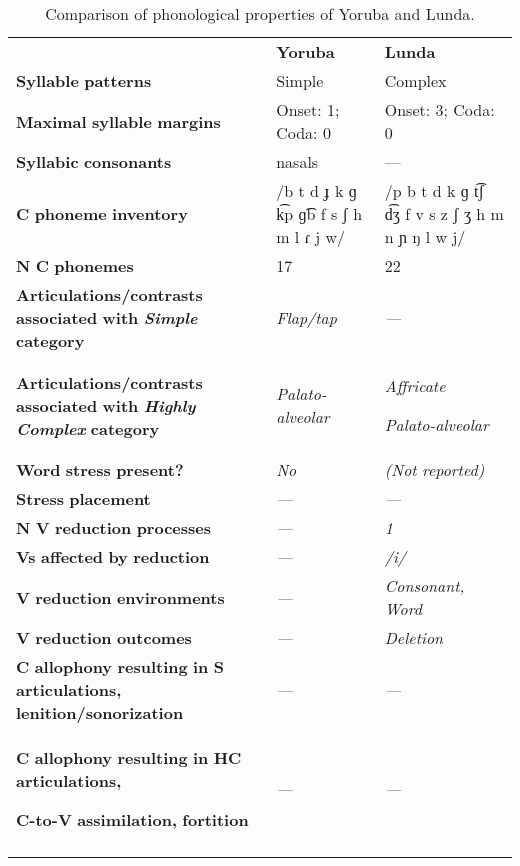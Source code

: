 \begin{table}
\begin{tabularx}{\textwidth}{XXX}
\lsptoprule
 & \textbf{Yoruba} & \textbf{Lunda}\\
 \textbf{Syllable} \textbf{patterns} & Simple & Complex\\
 \textbf{Maximal} \textbf{syllable} \textbf{margins} & Onset: 1; Coda: 0 & Onset: 3; Coda: 0\\
 \textbf{Syllabic} \textbf{consonants} & nasals & —\\
 \textbf{C} \textbf{phoneme} \textbf{inventory} & /b t d ɟ k ɡ k͡p ɡ͡b f s ʃ h m l ɾ j w/ & /p b t d k ɡ t͡ʃ d͡ʒ f v s z ʃ ʒ h m n ɲ ŋ l w j/\\
 \textbf{N} \textbf{C} \textbf{phonemes} & 17 & 22\\
 \textbf{Articulations/contrasts} \textbf{associated} \textbf{with} \textbf{\textit{Simple}} \textbf{category} & \textit{Flap/tap} & \textit{—}\\
 \textbf{Articulations/contrasts} \textbf{associated} \textbf{with} \textbf{\textit{Highly} \textit{Complex}} \textbf{category} & \textit{Palato-alveolar} & { \textit{Affricate}}

 \textit{Palato-alveolar}\\
 \textbf{Word} \textbf{stress} \textbf{present?} & \textit{No} & \textit{(Not} \textit{reported)}\\
 \textbf{Stress} \textbf{placement} & \textit{—} & \textit{—}\\
 \textbf{N} \textbf{V} \textbf{reduction} \textbf{processes} & \textit{—} & \textit{1}\\
 \textbf{Vs} \textbf{affected} \textbf{by} \textbf{reduction}  & \textit{—} & \textit{/i/}\\
 \textbf{V} \textbf{reduction} \textbf{environments} & \textit{—} & \textit{Consonant,} \textit{Word}\\
 \textbf{V} \textbf{reduction} \textbf{outcomes} & \textit{—} & \textit{Deletion}\\
 \textbf{C} \textbf{allophony} \textbf{resulting} \textbf{in} \textbf{S} \textbf{articulations,} \textbf{lenition/sonorization} & \textit{—} & \textit{—}\\
{ \textbf{C} \textbf{allophony} \textbf{resulting} \textbf{in} \textbf{HC} \textbf{articulations,} }

 \textbf{C-to-V} \textbf{assimilation,} \textbf{fortition} & \textit{—} & \textit{—}\\
\lspbottomrule
\end{tabularx}
\caption{\label{8.4}Comparison of phonological properties of Yoruba and Lunda.}
\end{table}

